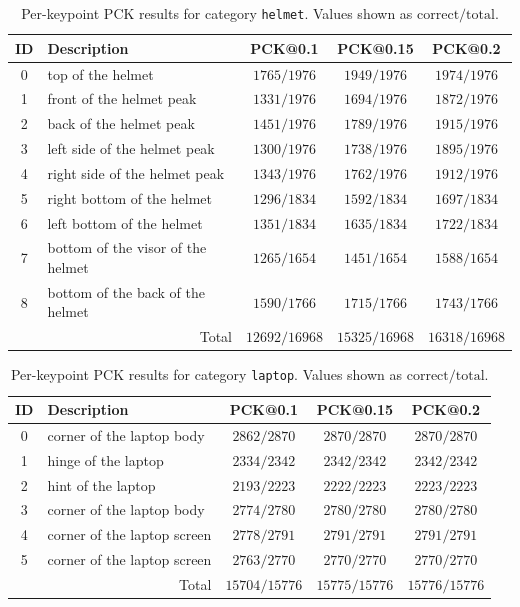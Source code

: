 \begin{table}[h]
\centering
\small
\caption{Per-keypoint PCK results for category \texttt{helmet}. Values shown as $\text{correct}/\text{total}$.}
\label{tab:pck_helmet}
\begin{tabular}{cl ccc}
\toprule
ID & Description & PCK@0.1 & PCK@0.15 & PCK@0.2 \\
\midrule
0 & top of the helmet & $1765/1976$ & $1949/1976$ & $1974/1976$ \\
1 & front of the helmet peak & $1331/1976$ & $1694/1976$ & $1872/1976$ \\
2 & back of the helmet peak & $1451/1976$ & $1789/1976$ & $1915/1976$ \\
3 & left side of the helmet peak & $1300/1976$ & $1738/1976$ & $1895/1976$ \\
4 & right side of the helmet peak & $1343/1976$ & $1762/1976$ & $1912/1976$ \\
5 & right bottom of the helmet & $1296/1834$ & $1592/1834$ & $1697/1834$ \\
6 & left bottom of the helmet & $1351/1834$ & $1635/1834$ & $1722/1834$ \\
7 & bottom of the visor of the helmet & $1265/1654$ & $1451/1654$ & $1588/1654$ \\
8 & bottom of the back of the helmet & $1590/1766$ & $1715/1766$ & $1743/1766$ \\
\midrule
\multicolumn{2}{r}{Total} & $12692/16968$ & $15325/16968$ & $16318/16968$ \\
\bottomrule
\end{tabular}
\end{table}

\begin{table}[h]
\centering
\small
\caption{Per-keypoint PCK results for category \texttt{laptop}. Values shown as $\text{correct}/\text{total}$.}
\label{tab:pck_laptop}
\begin{tabular}{cl ccc}
\toprule
ID & Description & PCK@0.1 & PCK@0.15 & PCK@0.2 \\
\midrule
0 & corner of the laptop body & $2862/2870$ & $2870/2870$ & $2870/2870$ \\
1 & hinge of the laptop & $2334/2342$ & $2342/2342$ & $2342/2342$ \\
2 & hint of the laptop & $2193/2223$ & $2222/2223$ & $2223/2223$ \\
3 & corner of the laptop body & $2774/2780$ & $2780/2780$ & $2780/2780$ \\
4 & corner of the laptop screen & $2778/2791$ & $2791/2791$ & $2791/2791$ \\
5 & corner of the laptop screen & $2763/2770$ & $2770/2770$ & $2770/2770$ \\
\midrule
\multicolumn{2}{r}{Total} & $15704/15776$ & $15775/15776$ & $15776/15776$ \\
\bottomrule
\end{tabular}
\end{table}

